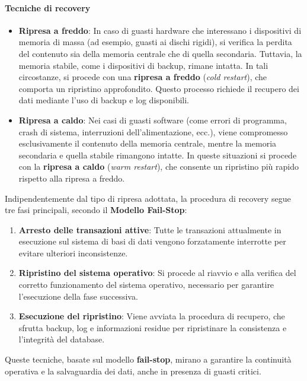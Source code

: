\paragraph{Tecniche di recovery}

\begin{itemize}
    \item \textbf{Ripresa a freddo}:  
    In caso di guasti hardware che interessano i dispositivi di memoria di massa (ad esempio, guasti ai dischi rigidi), si verifica la perdita del contenuto sia della memoria centrale che di quella secondaria. Tuttavia, la memoria stabile, come i dispositivi di backup, rimane intatta. In tali circostanze, si procede con una \textbf{ripresa a freddo} (\emph{cold restart}), che comporta un ripristino approfondito. Questo processo richiede il recupero dei dati mediante l'uso di backup e log disponibili.
    \item \textbf{Ripresa a caldo}:  
    Nei casi di guasti software (come errori di programma, crash di sistema, interruzioni dell’alimentazione, ecc.), viene compromesso esclusivamente il contenuto della memoria centrale, mentre la memoria secondaria e quella stabile rimangono intatte. In queste situazioni si procede con la \textbf{ripresa a caldo} (\emph{warm restart}), che consente un ripristino più rapido rispetto alla ripresa a freddo.
\end{itemize}

Indipendentemente dal tipo di ripresa adottata, la procedura di recovery segue tre fasi principali, secondo il \textbf{Modello Fail-Stop}:

\begin{enumerate}
    \item \textbf{Arresto delle transazioni attive}:  
    Tutte le transazioni attualmente in esecuzione sul sistema di basi di dati vengono forzatamente interrotte per evitare ulteriori inconsistenze.
    
    \item \textbf{Ripristino del sistema operativo}:  
    Si procede al riavvio e alla verifica del corretto funzionamento del sistema operativo, necessario per garantire l’esecuzione della fase successiva.
    
    \item \textbf{Esecuzione del ripristino}:  
    Viene avviata la procedura di recupero, che sfrutta backup, log e informazioni residue per ripristinare la consistenza e l'integrità del database.
\end{enumerate}

Queste tecniche, basate sul modello \textbf{fail-stop}, mirano a garantire la continuità operativa e la salvaguardia dei dati, anche in presenza di guasti critici.
